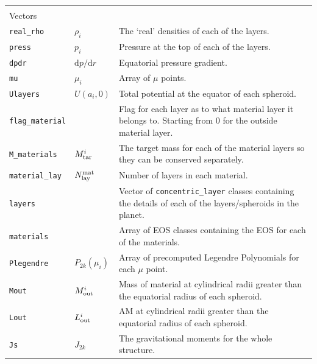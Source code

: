 \documentclass[11pt, oneside]{article}   	%
\begin{document}
\begin{longtable}{l l p{10cm}}
\multicolumn{3}{l}{} \\
\multicolumn{3}{l}{Vectors} \\
\hline
\texttt{real\_rho} & $\rho_i$ & The `real' densities of each of the layers. \\
\texttt{press} & $p_i$ & Pressure at the top of each of the layers. \\
\texttt{dpdr} & $\mathrm{d}p/\mathrm{d}r$ & Equatorial pressure gradient. \\
\texttt{mu} & $\mu_i$ & Array of $\mu$ points. \\
\texttt{Ulayers} & $U(a_i, 0)$ & Total potential at the equator of each spheroid. \\
\texttt{flag\_material} & & Flag for each layer as to what material layer it belongs to. Starting from 0 for the outside material layer. \\
\texttt{M\_materials} & $M_{\rm tar}^i$ & The target mass for each of the material layers so they can be conserved separately. \\
\texttt{material\_lay} & $N_{\rm lay}^{\rm mat}$ & Number of layers in each material. \\
\texttt{layers} & & Vector of \texttt{concentric\_layer} classes containing the details of each of the layers/spheroids in the planet. \\
\texttt{materials} & & Array of EOS classes containing the EOS for each of the materials. \\
\texttt{Plegendre} & $P_{2k}(\mu_i)$ & Array of precomputed Legendre Polynomials for each $\mu$ point. \\
\texttt{Mout} & $M_{\rm out}^i$ & Mass of material at cylindrical radii greater than the equatorial radius of each spheroid. \\
\texttt{Lout} & $L_{\rm out}^i$ & AM at cylindrical radii greater than the equatorial radius of each spheroid. \\
\texttt{Js} & $J_{2k}$ & The gravitational moments for the whole structure. \\


\end{longtable}
\end{document}
